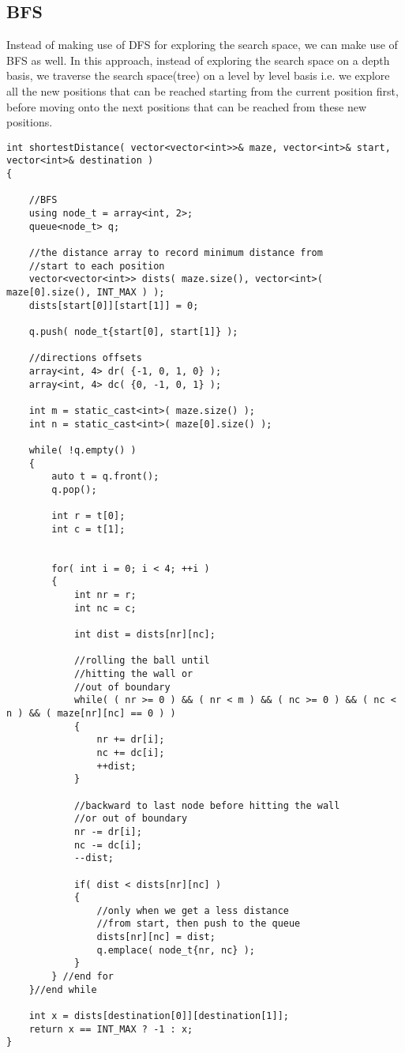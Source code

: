 \subsection{BFS}
Instead of making use of DFS for exploring the search space, we can make use of BFS as well. In this approach, instead of exploring the search space on a depth basis, we traverse the search space(tree) on a level by level basis i.e. we explore all the new positions that can be reached starting from the current position first, before moving onto the next positions that can be reached from these new positions.

\setcounter{lstlisting}{0}
\begin{lstlisting}[style=customc, caption={BFS}]
int shortestDistance( vector<vector<int>>& maze, vector<int>& start, vector<int>& destination )
{

    //BFS
    using node_t = array<int, 2>;
    queue<node_t> q;

    //the distance array to record minimum distance from
    //start to each position
    vector<vector<int>> dists( maze.size(), vector<int>( maze[0].size(), INT_MAX ) );
    dists[start[0]][start[1]] = 0;

    q.push( node_t{start[0], start[1]} );

    //directions offsets
    array<int, 4> dr( {-1, 0, 1, 0} );
    array<int, 4> dc( {0, -1, 0, 1} );

    int m = static_cast<int>( maze.size() );
    int n = static_cast<int>( maze[0].size() );

    while( !q.empty() )
    {
        auto t = q.front();
        q.pop();

        int r = t[0];
        int c = t[1];


        for( int i = 0; i < 4; ++i )
        {
            int nr = r;
            int nc = c;

            int dist = dists[nr][nc];

            //rolling the ball until
            //hitting the wall or
            //out of boundary
            while( ( nr >= 0 ) && ( nr < m ) && ( nc >= 0 ) && ( nc < n ) && ( maze[nr][nc] == 0 ) )
            {
                nr += dr[i];
                nc += dc[i];
                ++dist;
            }

            //backward to last node before hitting the wall
            //or out of boundary
            nr -= dr[i];
            nc -= dc[i];
            --dist;

            if( dist < dists[nr][nc] )
            {
                //only when we get a less distance
                //from start, then push to the queue
                dists[nr][nc] = dist;
                q.emplace( node_t{nr, nc} );
            }
        } //end for
    }//end while

    int x = dists[destination[0]][destination[1]];
    return x == INT_MAX ? -1 : x;
}
\end{lstlisting}

